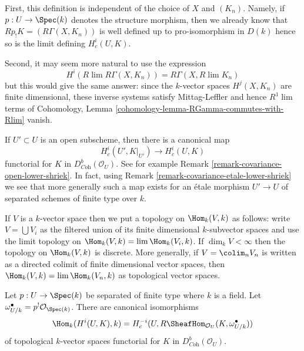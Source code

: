 \medskip\noindent
First, this definition is independent of the choice of $X$ and $(K_n)$.
Namely, if $p : U \to \Spec(k)$ denotes the structure morphism, then
we already know that $Rp_!K = (R\Gamma(X, K_n))$
is well defined up to pro-isomorphism in $D(k)$ hence so is the limit
defining $H^i_c(U, K)$.

\medskip\noindent
Second, it may seem more natural to use the expression
$$
H^i(R\lim R\Gamma(X, K_n)) = R\Gamma(X, R\lim K_n)
$$
but this would give the same answer: since the $k$-vector spaces
$H^j(X, K_n)$ are finite dimensional, these inverse systems satisfy
Mittag-Leffler and hence $R^1\lim$ terms of Cohomology, Lemma
\ref{cohomology-lemma-RGamma-commutes-with-Rlim} vanish.

\medskip\noindent
If $U' \subset U$ is an open subscheme, then there is a canonical map
$$
H^i_c(U', K|_{U'}) \longrightarrow H^i_c(U, K)
$$
functorial for $K$ in $D^b_{\textit{Coh}}(\mathcal{O}_U)$.
See for example Remark \ref{remark-covariance-open-lower-shriek}.
In fact, using Remark \ref{remark-covariance-etale-lower-shriek}
we see that more generally such a map exists for an \'etale morphism
$U' \to U$ of separated schemes of finite type over $k$.

\medskip\noindent
If $V$ is a $k$-vector space then we put a topology on $\Hom_k(V, k)$
as follows: write $V = \bigcup V_i$ as the filtered union of its finite
dimensional $k$-subvector spaces and use the limit topology on
$\Hom_k(V, k) = \lim \Hom_k(V_i, k)$. If $\dim_k V < \infty$ then
the topology on $\Hom_k(V, k)$ is discrete. More generally, if
$V = \colim_n V_n$ is written as a directed colimit of finite dimensional
vector spaces, then $\Hom_k(V, k) = \lim \Hom_k(V_n, k)$ as topological
vector spaces.

\begin{lemma}
\label{lemma-duality-compact-support}
Let $p : U \to \Spec(k)$ be separated of finite type where $k$ is a field.
Let $\omega_{U/k}^\bullet = p^!\mathcal{O}_{\Spec(k)}$.
There are canonical isomorphisms
$$
\Hom_k(H^i(U, K), k) =
H^{-i}_c(U, R\SheafHom_{\mathcal{O}_U}(K, \omega_{U/k}^\bullet))
$$
of topological $k$-vector spaces
functorial for $K$ in $D^b_{\textit{Coh}}(\mathcal{O}_U)$.
\end{lemma}

